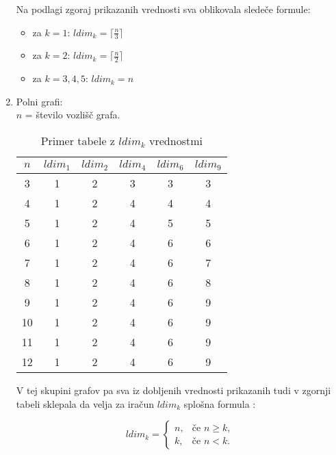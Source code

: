 \documentclass[12pt,a4paper]{amsart}
\theoremstyle{plain} %
\begin{document}
\begin{enumerate}
Na podlagi zgoraj prikazanih vrednosti sva oblikovala sledeče formule:
\begin{itemize}
    \item za $k=1$: $ldim_k= \lceil \frac{n}{3} \rceil$ 
    \item za $k = 2$: $ ldim_k= \lceil \frac{n}{2} \rceil $
    \item za $k= 3,4,5$: $ ldim_k= n $
\end{itemize}

\item Polni grafi: \\
$n$ = število vozlišč grafa.

\begin{table}[h]
    \begin{center}
        \begin{tabular}{|c|c|c|c|c|c|}
            \hline
            $n$ & $ldim_1$ & $ldim_2$ & $ldim_4$ & $ldim_6$ & $ldim_9$ \\
            \hline
            
            
            3 & 1 & 2 & 3 & 3 & 3 \\
            4 & 1 & 2 & 4 & 4 & 4 \\
            5 & 1 & 2 & 4 & 5 & 5 \\
            6 & 1 & 2 & 4 & 6 & 6 \\
            7 & 1 & 2 & 4 & 6 & 7 \\
            8 & 1 & 2 & 4 & 6 & 8 \\
            9 & 1 & 2 & 4 & 6 & 9 \\
            10 & 1 & 2 & 4 & 6 & 9 \\
            11 & 1 & 2 & 4 & 6 & 9 \\
            12 & 1 & 2 & 4 & 6 & 9 \\
            \hline
        \end{tabular}
    \end{center}
    \caption{Primer tabele z $ldim_k$ vrednostmi}
    \label{tab:tabela_ldim_k}
\end{table}

V tej skupini grafov pa sva iz dobljenih vrednosti prikazanih tudi v zgornji tabeli sklepala da velja za iračun $ldim_k$ splošna formula :

\begin{equation}
ldim_k =
\begin{cases}
  n, & \text{če } n \geq k, \\
  k, & \text{če } n < k. \nonumber
\end{cases}
\end{equation}


\end{enumerate}
\end{document}
